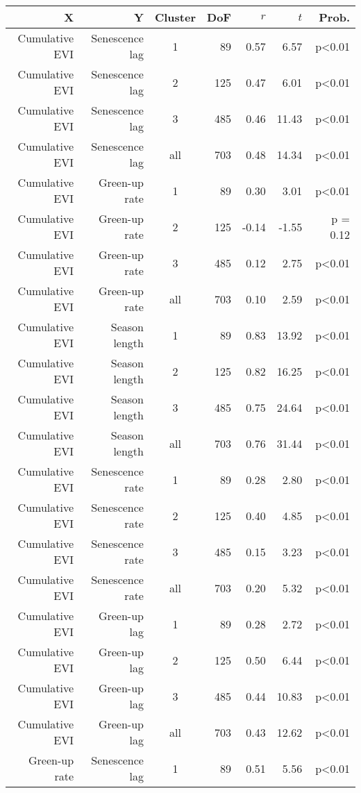 \begin{table}[H]
\centering
\begin{tabular}{rrcrrrr}
  \hline
X & Y & Cluster & DoF & $r$ & $t$ & Prob. \\ 
  \hline
Cumulative EVI & Senescence lag & 1 &  89 & 0.57 & 6.57 & p<0.01 \\ 
  Cumulative EVI & Senescence lag & 2 & 125 & 0.47 & 6.01 & p<0.01 \\ 
  Cumulative EVI & Senescence lag & 3 & 485 & 0.46 & 11.43 & p<0.01 \\ 
  Cumulative EVI & Senescence lag & all & 703 & 0.48 & 14.34 & p<0.01 \\ 
   \hline
Cumulative EVI & Green-up rate & 1 &  89 & 0.30 & 3.01 & p<0.01 \\ 
  Cumulative EVI & Green-up rate & 2 & 125 & -0.14 & -1.55 & p = 0.12 \\ 
  Cumulative EVI & Green-up rate & 3 & 485 & 0.12 & 2.75 & p<0.01 \\ 
  Cumulative EVI & Green-up rate & all & 703 & 0.10 & 2.59 & p<0.01 \\ 
   \hline
Cumulative EVI & Season length & 1 &  89 & 0.83 & 13.92 & p<0.01 \\ 
  Cumulative EVI & Season length & 2 & 125 & 0.82 & 16.25 & p<0.01 \\ 
  Cumulative EVI & Season length & 3 & 485 & 0.75 & 24.64 & p<0.01 \\ 
  Cumulative EVI & Season length & all & 703 & 0.76 & 31.44 & p<0.01 \\ 
   \hline
Cumulative EVI & Senescence rate & 1 &  89 & 0.28 & 2.80 & p<0.01 \\ 
  Cumulative EVI & Senescence rate & 2 & 125 & 0.40 & 4.85 & p<0.01 \\ 
  Cumulative EVI & Senescence rate & 3 & 485 & 0.15 & 3.23 & p<0.01 \\ 
  Cumulative EVI & Senescence rate & all & 703 & 0.20 & 5.32 & p<0.01 \\ 
   \hline
Cumulative EVI & Green-up lag & 1 &  89 & 0.28 & 2.72 & p<0.01 \\ 
  Cumulative EVI & Green-up lag & 2 & 125 & 0.50 & 6.44 & p<0.01 \\ 
  Cumulative EVI & Green-up lag & 3 & 485 & 0.44 & 10.83 & p<0.01 \\ 
  Cumulative EVI & Green-up lag & all & 703 & 0.43 & 12.62 & p<0.01 \\ 
   \hline
Green-up rate & Senescence lag & 1 &  89 & 0.51 & 5.56 & p<0.01 \\ 

\end{tabular}
\end{table}

